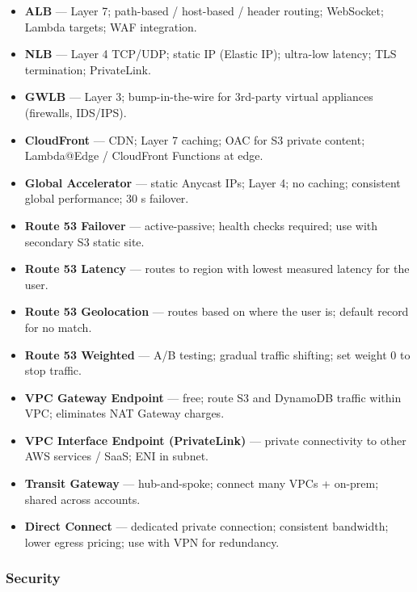 \begin{keyfacts}
\begin{itemize}
  \item \textbf{ALB} --- Layer 7; path-based / host-based / header routing; WebSocket; Lambda targets; WAF integration.
  \item \textbf{NLB} --- Layer 4 TCP/UDP; static IP (Elastic IP); ultra-low latency; TLS termination; PrivateLink.
  \item \textbf{GWLB} --- Layer 3; bump-in-the-wire for 3rd-party virtual appliances (firewalls, IDS/IPS).
  \item \textbf{CloudFront} --- CDN; Layer 7 caching; OAC for S3 private content; Lambda@Edge / CloudFront Functions at edge.
  \item \textbf{Global Accelerator} --- static Anycast IPs; Layer 4; no caching; consistent global performance; 30 s failover.
  \item \textbf{Route 53 Failover} --- active-passive; health checks required; use with secondary S3 static site.
  \item \textbf{Route 53 Latency} --- routes to region with lowest measured latency for the user.
  \item \textbf{Route 53 Geolocation} --- routes based on where the user is; default record for no match.
  \item \textbf{Route 53 Weighted} --- A/B testing; gradual traffic shifting; set weight 0 to stop traffic.
  \item \textbf{VPC Gateway Endpoint} --- free; route S3 and DynamoDB traffic within VPC; eliminates NAT Gateway charges.
  \item \textbf{VPC Interface Endpoint (PrivateLink)} --- private connectivity to other AWS services / SaaS; ENI in subnet.
  \item \textbf{Transit Gateway} --- hub-and-spoke; connect many VPCs + on-prem; shared across accounts.
  \item \textbf{Direct Connect} --- dedicated private connection; consistent bandwidth; lower egress pricing; use with VPN for redundancy.
\end{itemize}
\end{keyfacts}

\subsubsection{Security}

